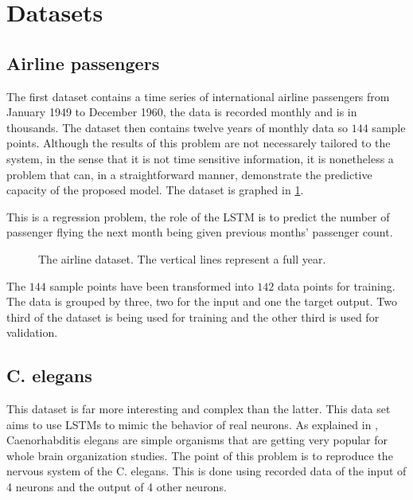 \section{Datasets}

\subsection{Airline passengers}

The first dataset contains a time series of international airline passengers from January 1949 to December 1960, the data is recorded monthly and is in thousands. The dataset then contains twelve years of monthly data so $144$ sample points. Although the results of this problem are not necessarely tailored to the system, in the sense that it is not time sensitive information, it is nonetheless a problem that can, in a straightforward manner, demonstrate the predictive capacity of the proposed model. The dataset is graphed in \cref{graph:airline}.

This is a regression problem, the role of the \ac{LSTM} is to predict the number of passenger flying the next month being given previous months' passenger count.

\begin{figure}[b]
  \centering
  
  \caption{The airline dataset. The vertical lines represent a full year.}
  \label{graph:airline}
\end{figure}

The $144$ sample points have been transformed into $142$ data points for training. The data is grouped by three, two for the input and one the target output. Two third of the dataset is being used for training and the other third is used for validation.

\subsection{C. elegans}

This dataset is far more interesting and complex than the latter. This data set aims to use \acp{LSTM} to mimic the behavior of real neurons. As explained in \cite{celegans}, Caenorhabditis elegans are simple organisms that are getting very popular for whole brain organization studies. The point of this problem is to reproduce the nervous system of the \ac{C. elegans}. This is done using recorded data of the input of 4 neurons and the output of 4 other neurons.


